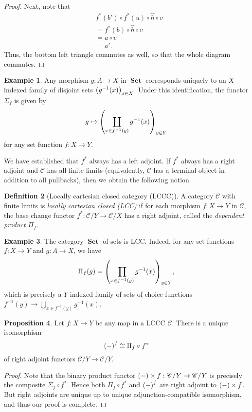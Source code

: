 \documentclass[10pt,letterpaper,cm]{nupset}
\theoremstyle{definition}
\newtheorem{definition}{Definition}[subsection]
\newtheorem{exmp}[definition]{Example}
\theoremstyle{theorem}
\newtheorem{prop}[definition]{Proposition}
\theoremstyle{remark}
\newcommand{\0}{\mathbf{0}}
\newcommand{\1}{\mathbf{1}}
\newcommand{\2}{\mathbf{2}}
\DeclareMathOperator{\set}{\mathbf{Set}}
\renewcommand{\c}{\mathscr{C}}
\begin{document}
\begin{proof}
Next, note that 
\begin{align*}
& f^{\ast}(b') \circ  f^{\ast}(u) \circ \hat{h} \circ v
\\ & = f^{\ast}(b) \circ \hat{h} \circ v
\\ & = a \circ v
\\ &  = a'.
\end{align*}
Thus, the bottom left triangle commutes as well, so that the whole diagram commutes. 
\end{proof}

\begin{exmp}
Any  morphism $g: A \to X$ in $\set$ corresponds uniquely to an $X$-indexed family of disjoint sets $\mleft(g^{-1}(x)\mright)_{x\in X}$. Under this identification, the functor $\Sigma_f$ is given by $$g \mapsto \mleft(\coprod_{x\in f^{-1}(y)} g^{-1}(x)\mright)_{y\in Y} $$ for any set function $f: X \to Y$.
\end{exmp}

\medskip
We have established that $f^{\ast}$ always has a left adjoint. If $f^{\ast}$ always has a right adjoint and $\c$ has all finite limits (equivalently, $\c$ has a terminal object in addition to all pullbacks), then we obtain the following notion.  


\begin{definition}[Locally cartesian closed category (LCCC)]
A category $\c$ with finite limits is \textit{locally cartesian closed (LCC)} if for each morphism $f: X \to Y$ in $\c$, the base change functor $f^{\ast}: \c/Y \to \c/X$ has a right adjoint, called the \textit{dependent product $\Pi_f$}.
\end{definition}

\begin{exmp}
The category $\set$ of sets is LCC. Indeed, for any set functions $f: X \to Y$ and $g: A \to X$, we have $$\Pi_f(g)  = \mleft(\prod_{x \in f^{-1}(y)} g^{-1}(x)\mright)_{y \in Y},$$ which is precisely a $Y$-indexed family of sets of choice functions $f^{-1}(y) \to \bigcup_{x \in f^{-1}(y)}g^{-1}(x)$.
\end{exmp}

\begin{prop}\label{inthom}
Let $f: X\to Y$ be any map in a LCCC $\c$. There is a unique isomorphism $$\mleft({-}\mright)^f \cong \Pi_f \circ f^{\ast}$$ of right adjoint functors $\c/Y \to \c/Y$.
\end{prop}
\begin{proof}
Note that the binary product functor $\mleft({-}\mright)\times f : \c/Y\to \c/Y$ is precisely the composite $\Sigma_f \circ f^{\ast}$. Hence  both $\Pi_f \circ f^{\ast}$ and $\mleft({-}\mright)^f$ are right adjoint to $\mleft({-}\mright)\times f$. But right adjoints are unique up to unique adjunction-compatible isomorphism, and thus our proof is complete. 
\end{proof}
\end{document}
